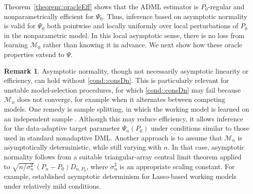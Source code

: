 \documentclass[11pt]{article}
\theoremstyle{definition}
\newtheorem{remark}{Remark}
\begin{document}
 



 
Theorem~\ref{theorem::oracleEff} shows that the ADML estimator is \(P_0\)-regular and nonparametrically efficient for \(\Psi_0\). Thus, inference based on asymptotic normality is valid for \(\Psi_0\) both pointwise and locally uniformly over local perturbations of \(P_0\) in the nonparametric model. In this local asymptotic sense, there is no loss from learning \(\mathcal{M}_0\) rather than knowing it in advance. We next show how these oracle properties extend to \(\Psi\). 
 
 



\begin{remark}
Asymptotic normality, though not necessarily asymptotic linearity or efficiency, can hold without \ref{cond::consDn}. This is particularly relevant for unstable model-selection procedures, for which \ref{cond::consDn} may fail because \(\mathcal{M}_n\) does not converge, for example when it alternates between competing models. One remedy is sample splitting, in which the working model is learned on an independent sample \citep{van2013AdaptTarget, rinaldo2019bootstrapping}. Although this may reduce efficiency, it allows inference for the data-adaptive target parameter \(\Psi_n(P_0)\) under conditions similar to those used in standard nonadaptive DML. Another approach is to assume that \(\mathcal{M}_n\) is asymptotically deterministic, while still varying with \(n\). In that case, asymptotic normality follows from a suitable triangular-array central limit theorem applied to \(\sqrt{n/\sigma_n^2}\,(P_n-P_0)D_{n,P_0}\), where \(\sigma_n^2\) is an appropriate scaling constant. For example, \cite{danielleWittenLassoWorks} established asymptotic determinism for Lasso-based working models under relatively mild conditions.
\end{remark}
 
\end{document}

